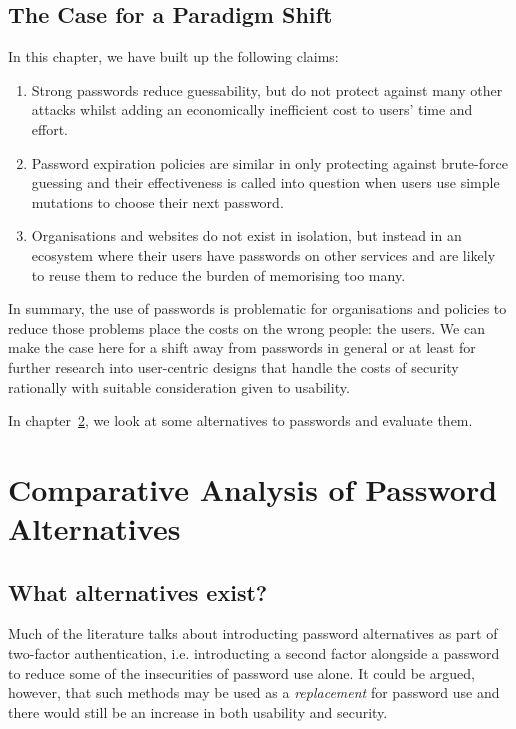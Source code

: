 \documentclass{report}
\begin{document}
\section{The Case for a Paradigm Shift}

In this chapter, we have built up the following claims:

\begin{enumerate}
  \item Strong passwords reduce guessability, but do not protect against
    many other attacks whilst adding an economically inefficient cost to users'
    time and effort.
  \item Password expiration policies are similar in only protecting against
    brute-force guessing and their effectiveness is called into question when
    users use simple mutations to choose their next password.
  \item Organisations and websites do not exist in isolation, but instead in
    an ecosystem where their users have passwords on other services and are likely
    to reuse them to reduce the burden of memorising too many.
\end{enumerate}

In summary, the use of passwords is problematic for organisations and policies
to reduce those problems place the costs on the wrong people: the users. We can
make the case here for a shift away from passwords in general or at least
for further research into user-centric designs that handle the costs of security
rationally with suitable consideration given to usability.

In chapter~\ref{chapter:alternatives}, we look at some alternatives to passwords
and evaluate them.

\chapter{Comparative Analysis of Password Alternatives}
\label{chapter:alternatives}

\section{What alternatives exist?}

Much of the literature talks about introducting password alternatives
as part of two-factor authentication, i.e. introducting a second factor
alongside a password to reduce some of the insecurities of password use
alone. It could be argued, however, that such methods may be used as
a \emph{replacement} for password use and there would still be an increase
in both usability and security.
\end{document}
